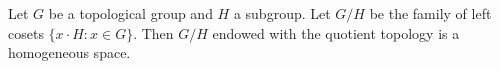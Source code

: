 Let $G$ be a topological group and $H$ a subgroup. Let $G/H$ be the family of left cosets $\{x \cdot H : x \in G\}$. Then $G/H$ endowed with the quotient topology is a homogeneous space.
